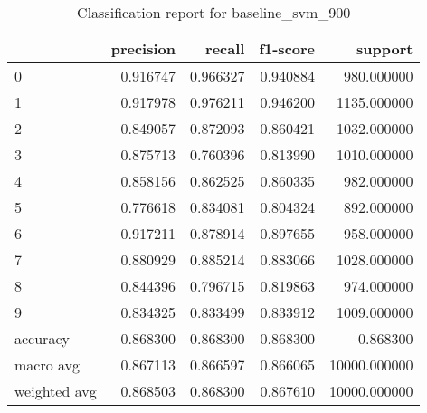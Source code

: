 \begin{table}[htb!]
\centering
\caption{Classification report for baseline_svm_900}
\label{tab:classification-report-baseline_svm_900}
\begin{tabular}{lrrrr}
\toprule
 & precision & recall & f1-score & support \\
\midrule
0 & 0.916747 & 0.966327 & 0.940884 & 980.000000 \\
1 & 0.917978 & 0.976211 & 0.946200 & 1135.000000 \\
2 & 0.849057 & 0.872093 & 0.860421 & 1032.000000 \\
3 & 0.875713 & 0.760396 & 0.813990 & 1010.000000 \\
4 & 0.858156 & 0.862525 & 0.860335 & 982.000000 \\
5 & 0.776618 & 0.834081 & 0.804324 & 892.000000 \\
6 & 0.917211 & 0.878914 & 0.897655 & 958.000000 \\
7 & 0.880929 & 0.885214 & 0.883066 & 1028.000000 \\
8 & 0.844396 & 0.796715 & 0.819863 & 974.000000 \\
9 & 0.834325 & 0.833499 & 0.833912 & 1009.000000 \\
accuracy & 0.868300 & 0.868300 & 0.868300 & 0.868300 \\
macro avg & 0.867113 & 0.866597 & 0.866065 & 10000.000000 \\
weighted avg & 0.868503 & 0.868300 & 0.867610 & 10000.000000 \\
\bottomrule
\end{tabular}
\end{table}
